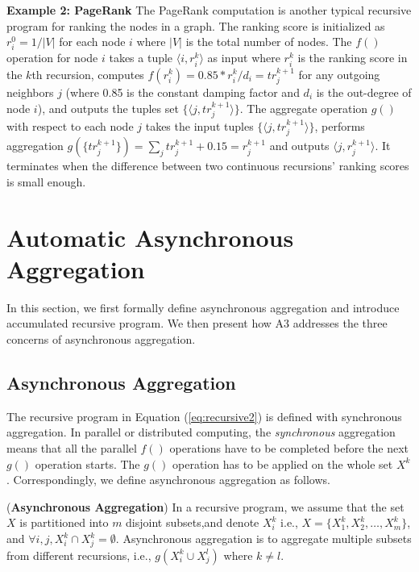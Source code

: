 \documentclass{vldb}
\begin{document}
\textbf{Example 2: PageRank} The PageRank computation is another typical recursive program for ranking the nodes in a graph. The ranking score is initialized as $r_i^0=1/|V|$ for each node $i$ where $|V|$ is the total number of nodes. The $f()$ operation for node $i$ takes a tuple $\langle i,r_i^k\rangle$ as input where $r_i^k$ is the ranking score in the $k$th recursion, computes $f(r_i^k)=0.85*r_i^k/d_i=tr_j^{k+1}$ for any outgoing neighbors $j$ (where 0.85 is the constant damping factor and $d_i$ is the out-degree of node $i$), and outputs the tuples set $\{\langle j,tr_j^{k+1}\rangle\}$. The aggregate operation $g()$ with respect to each node $j$ takes the input tuples $\{\langle j,tr_j^{k+1}\rangle\}$, performs aggregation $g(\{tr_j^{k+1}\})=\sum_j{tr_j^{k+1}}+0.15=r_j^{k+1}$ and outputs $\langle j,r_j^{k+1}\rangle$. It terminates when the difference between two continuous recursions' ranking scores is small enough.

\section{Automatic Asynchronous Aggregation}
\label{sec:async}
In this section, we first formally define asynchronous aggregation and introduce accumulated recursive program. We then present how A3 addresses the three concerns of asynchronous aggregation.

\subsection{Asynchronous Aggregation}
\label{sec:async:async}

The recursive program in Equation (\ref{eq:recursive2}) is defined with synchronous aggregation. In parallel or distributed computing, the \emph{synchronous} aggregation means that all the parallel $f()$ operations have to be completed before the next $g()$ operation starts. The $g()$ operation has to be applied on the whole set $X^k$. Correspondingly, we define asynchronous aggregation as follows.

\begin{definition}
	\label{def:asyncaggre}
	(\textbf{Asynchronous Aggregation}) In a recursive program, we assume that the set $X$  is partitioned into $m$ disjoint subsets,and denote $X_i^k$ i.e., $X=\{X_1^k,X_2^k,\ldots,X_m^k\}$, and $\forall i,j, X_i^k\cap X_j^k=\emptyset$. Asynchronous aggregation is to aggregate multiple subsets from different recursions, i.e., $g(X_i^k\cup X_j^{l})$ where $k\neq l$.
\end{definition}
\end{document}
